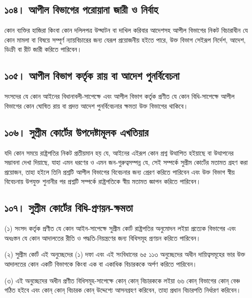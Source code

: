 \documentclass[11pt]{article}
\begin{document}
\subsection{১০৪। আপীল বিভাগের পরোয়ানা জারী ও নির্বাহ}
\label{sec:org323ef23}
কোন ব্যক্তির হাজিরা কিংবা কোন দলিলপত্র উদ্ঘাটন বা দাখিল করিবার আদেশসহ
আপীল বিভাগের নিকট বিচারাধীন যে কোন মামলা বা বিষয়ে সম্পূর্ণ ন্যায়বিচারের
জন্য যেরূপ প্রয়োজনীয় হইতে পারে, উক্ত বিভাগ সেইরূপ নির্দেশ, আদেশ, ডিক্রী বা
রীট জারী করিতে পারিবেন।

\subsection{১০৫। আপীল বিভাগ কর্তৃক রায় বা আদেশ পুনর্বিবেচনা}
\label{sec:orgac48555}
সংসদের যে কোন আইনের বিধানাবলী-সাপেক্ষে এবং আপীল বিভাগ কর্তৃক প্রণীত যে কোন
বিধি-সাপেক্ষে আপীল বিভাগের কোন ঘোষিত রায় বা প্রদত্ত আদেশ পুনর্বিবেচনার
ক্ষমতা উক্ত বিভাগের থাকিবে।

\subsection{১০৬। সুপ্রীম কোর্টের উপদেষ্টামূলক এখতিয়ার}
\label{sec:org2b033dc}
যদি কোন সময়ে রাষ্ট্রপতির নিকট প্রতীয়মান হয় যে, আইনের এইরূপ কোন প্রশ্ন
উত্থাপিত হইয়াছে বা উত্থাপনের সম্ভাবনা দেখা দিয়াছে, যাহা এমন ধরণের ও এমন
জন-গুরুত্বসম্পন্ন যে, সেই সম্পর্কে সুপ্রীম কোর্টের মতামত গ্রহণ করা প্রয়োজন, তাহা
হইলে তিনি প্রশ্নটি আপীল বিভাগের বিবেচনার জন্য প্রেরণ করিতে পারিবেন এবং উক্ত
বিভাগ স্বীয় বিবেচনায় উপযুক্ত শুনানীর পর প্রশ্নটি সম্পর্কে রাষ্ট্রপতিকে স্বীয়
মতামত জ্ঞাপন করিতে পারিবেন।

\subsection{১০৭। সুপ্রীম কোর্টের বিধি-প্রণয়ন-ক্ষমতা}
\label{sec:org4f51dce}
(১) সংসদ কর্তৃক প্রণীত যে কোন আইন-সাপেক্ষে সুপ্রীম কোর্ট রাষ্ট্রপতির অনুমোদন
    লইয়া প্রত্যেক বিভাগের এবং অধঃস্তন যে কোন আদালতের রীতি ও পদ্ধতি-নিয়ন্ত্রণের
    জন্য বিধিসমূহ প্রণয়ন করিতে পারিবেন।

(২) সুপ্রীম কোর্ট এই অনুচ্ছেদের (১) দফা এবং এই সংবিধানের ৬৫ ১১৩ অনুচ্ছেদের
    অধীন দায়িত্বসমূহের ভার উক্ত আদালতের কোন একটি বিভাগকে কিংবা এক বা একাধিক
    বিচারককে অর্পণ করিতে পারিবেন।

(৩) এই অনুচ্ছেদের অধীন প্রণীত বিধিসমূহ-সাপেক্ষে কোন্ কোন্ বিচারককে লইয়া ৬৬
    কোন্ বিভাগের কোন্ বেঞ্চ গঠিত হইবে এবং কোন্ কোন্ বিচারক কোন্ উদ্দেশ্যে আসনগ্রহণ
    করিবেন, তাহা প্রধান বিচারপতি নির্ধারণ করিবেন।
\end{document}
